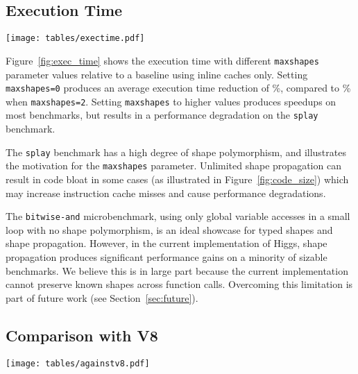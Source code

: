 \documentclass[preprint]{sigplanconf}
\newcommand{\percentstat}[1]{\unskip\%}
\begin{document}
\subsection{Execution Time}

\begin{figure*}[tb]
    \begin{center}
    \texttt{[image: tables/exectime.pdf]}
    \end{center}
\caption{Execution time relative to inline cache baseline (lower is better)\label{fig:exec_time}}
\end{figure*}

Figure~\ref{fig:exec_time} shows the execution time with different
{\tt maxshapes} parameter values relative to a baseline using inline caches
only. Setting {\tt maxshapes=0} produces an average execution time reduction
of \percentstat{exectime_decr_maxshapes0}, compared to
\percentstat{exectime_decr_maxshapes2} when {\tt maxshapes=2}. Setting
{\tt maxshapes} to higher values produces speedups on most
benchmarks, but results in a performance degradation on the {\tt splay}
benchmark.

The {\tt splay} benchmark has a high degree of shape polymorphism, and
illustrates the motivation for the {\tt maxshapes} parameter. Unlimited shape
propagation can result in code bloat in some cases (as illustrated in
Figure~\ref{fig:code_size}) which may increase instruction cache
misses and cause performance degradations.

The {\tt bitwise-and} microbenchmark, using only global variable accesses in
a small loop with no shape polymorphism, is an ideal showcase for typed shapes
and shape propagation. However, in the current implementation of Higgs, shape
propagation produces significant performance gains on a minority of sizable
benchmarks. We believe this is in large part because the current implementation
cannot preserve known shapes across function calls. Overcoming this limitation
is part of future work (see Section~\ref{sec:future}).

\subsection{Comparison with V8}

\begin{figure*}[tb]
    \begin{center}
    \texttt{[image: tables/againstv8.pdf]}
    \end{center}
\caption{Execution time relative to V8 baseline and V8 without inlining (log scale, bars above 100\% favor Higgs)\label{fig:against_v8}}
\end{figure*}
\end{document}
